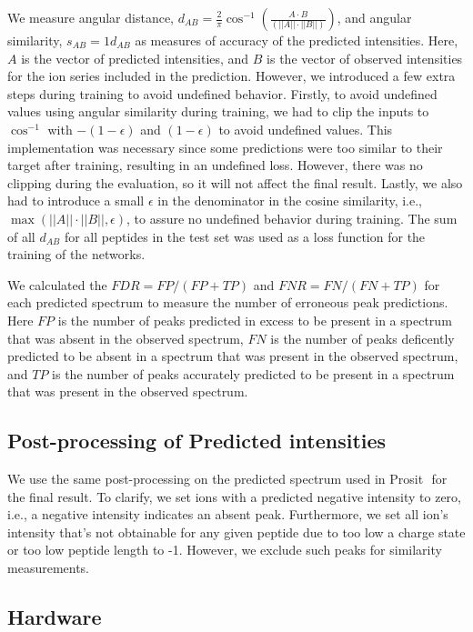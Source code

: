 \documentclass[10pt,a4paper]{article}
\begin{document}
We measure angular distance, $d_{AB}=\frac{2}{\pi} \cos^{-1}\left(\frac{A \cdot B}{(||A||\cdot||B||)}\right)$, and angular similarity, $s_{AB} = 1 d_{AB}$ as measures of accuracy of the predicted intensities. Here, $A$ is the vector of predicted intensities, and $B$ is the vector of observed intensities for the ion series included in the prediction. However, we introduced a few extra steps during training to avoid undefined behavior. Firstly, to avoid undefined values using angular similarity during training, we had to clip the inputs to $\cos^{-1}$ with $-(1-\epsilon)$ and $(1-\epsilon)$ to avoid undefined values. This implementation was necessary since some predictions were too similar to their target after training, resulting in an undefined loss. However, there was no clipping during the evaluation, so it will not affect the final result. Lastly, we also had to introduce a small $\epsilon$ in the denominator in the cosine similarity, i.e., $\max(||A||\cdot||B||, \epsilon)$, to assure no undefined behavior during training. The sum of all $d_{AB}$ for all peptides in the test set was used as a loss function for the training of the networks. 

We calculated the $\mathit{FDR}=\mathit{FP}/(\mathit{FP}+\mathit{TP})$ and $\mathit{FNR}=\mathit{FN}/(\mathit{FN}+\mathit{TP})$ for each predicted spectrum to measure the number of erroneous peak predictions. Here $\mathit{FP}$ is the number of peaks predicted in excess to be present in a spectrum that was absent in the observed spectrum, $\mathit{FN}$ is the number of peaks deficently predicted to be absent in a spectrum that was present in the observed spectrum, and $\mathit{TP}$ is the number of peaks accurately predicted to be present in a spectrum that was present in the observed spectrum.

\subsection*{Post-processing of Predicted intensities}
We use the same post-processing on the predicted spectrum used in Prosit ​\cite{Gessulat2019-el} for the final result. To clarify, we set ions with a predicted negative intensity to zero, i.e., a negative intensity indicates an absent peak. Furthermore, we set all ion's intensity that's not obtainable for any given peptide due to too low a charge state or too low peptide length to -1. However, we exclude such peaks for similarity measurements. 

\subsection*{Hardware}
\end{document}
